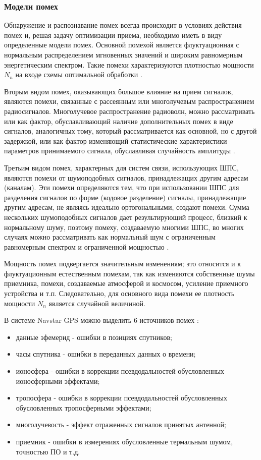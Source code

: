 \subsubsection{Модели помех}
\label{l:noise_model}
Обнаружение и распознавание помех всегда происходит в условиях действия помех и, решая задачу оптимизации приема,
необходимо иметь в виду определенные модели помех. Основной помехой является флуктуационная с нормальным
распределением мгновенных значений и широким равномерным энергетическим спектром. Такие помехи характеризуются
плотностью мощности ${N_n}$ на входе схемы оптимальной обработки \cite{pestryakov-book}.

Вторым видом помех, оказывающих
большое влияние на прием сигналов, являются помехи, связанные с рассеянным или многолучевым распространением
радиосигналов. Многолучевое распространение радиоволн, можно рассматривать или как фактор, обуславливающий
наличие дополнительных помех в виде сигналов, аналогичных тому, который рассматривается как основной, но с другой
задержкой, или как фактор изменяющий статистические характеристики параметров принимаемого сигнала,
обуславливая случайность амплитуды \cite{pestryakov-book}.

Третьим видом помех, характерных для систем связи, использующих ШПС, являются помехи от шумоподобных сигналов,
принадлежащих другим адресам (каналам). Эти помехи определяются тем, что при использовании ШПС для разделения
сигналов по форме (кодовое разделение) сигналы, принадлежащие другим адресам, не являясь идеально ортогональными,
создают помехи. Сумма нескольких шумоподобных сигналов дает результирующий процесс, близкий к нормальному шуму,
поэтому помеху, создаваемую многими ШПС, во многих случаях можно рассматривать как нормальный шум с ограниченным
равномерным спектром и ограниченной мощностью \cite{pestryakov-book}.

Мощность помех подвергается значительным изменениям; это относится и к флуктуационным естественным помехам, так как
изменяются собственные шумы приемника, помехи, создаваемые атмосферой и космосом, усиление приемного устройства
и т.п. Следовательно, для основного вида помехи ее плотность мощности ${N_n}$ является случайной величиной.

В системе Navstar GPS можно выделить 6 источников помех \cite{parkinson_1996}:
\begin{itemize}
	\item {данные эфемерид - ошибки в позициях спутников;}
	\item {часы спутника - ошибки в переданных данных о времени;}
	\item {ионосфера - ошибки в коррекции псевдодальностей обусловленных ионосферными эффектами;}
	\item {тропосфера - ошибки в коррекции псевдодальностей обусловленных обусловленных тропосферными эффектами;}
	\item {многолучевость - эффект отраженных сигналов принятых антенной;}
	\item {приемник - ошибки в измерениях обусловленные термальным шумом, точностью ПО и т.д.}
\end{itemize}

